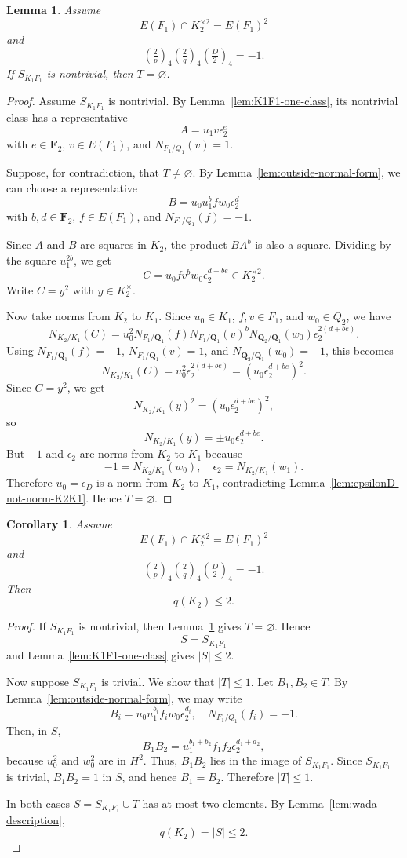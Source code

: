 \documentclass{article}
\numberwithin{equation}{section}
\theoremstyle{plain}  %
\newtheorem{corollary}{Corollary}[section]
\newtheorem{lemma}{Lemma}[section]
\theoremstyle{definition}
\newcommand{\kron}[2]{\left( \tfrac{#1}{#2} \right)}
\begin{document}
\begin{lemma}\label{lem:T-empty-if-SK1F1-nontrivial}
Assume
$$
E(F_1) \cap K_2^{\times 2}=E(F_1)^2
$$
and
$$
\kron{2}{p}_4\kron{2}{q}_4\kron{D}{2}_4=-1.
$$
If $S_{K_1F_1}$ is nontrivial, then $T=\varnothing$.
\end{lemma}

\begin{proof}
Assume $S_{K_1F_1}$ is nontrivial. By Lemma~\ref{lem:K1F1-one-class}, its nontrivial class has a representative
$$
A= u_1v\epsilon_2^e
$$
with $e \in \mathbf F_2$, $v \in E(F_1)$, and $N_{F_1/Q_1}(v)=1$.

Suppose, for contradiction, that $T \ne \varnothing$. By Lemma~\ref{lem:outside-normal-form}, we can choose a representative
$$
B= u_0u_1^b f w_0\epsilon_2^d
$$
with $b,d \in \mathbf F_2$, $f \in E(F_1)$, and $N_{F_1/Q_1}(f)=-1$.

Since $A$ and $B$ are squares in $K_2$, the product $BA^b$ is also a square. Dividing by the square $u_1^{2b}$, we get
$$
C=u_0f v^b w_0\epsilon_2^{d+be} \in K_2^{\times 2}.
$$
Write $C=y^2$ with $y \in K_2^\times$.

Now take norms from $K_2$ to $K_1$. Since $u_0 \in K_1$, $f,v \in F_1$, and $w_0 \in Q_2$, we have
$$
N_{K_2/K_1}(C)=u_0^2N_{F_1/\mathbf Q_1}(f)N_{F_1/\mathbf Q_1}(v)^bN_{\mathbf Q_2/\mathbf Q_1}(w_0)\epsilon_2^{2(d+be)}.
$$
Using $N_{F_1/\mathbf Q_1}(f)=-1$, $N_{F_1/\mathbf Q_1}(v)=1$, and $N_{\mathbf Q_2/\mathbf Q_1}(w_0)=-1$, this becomes
$$
N_{K_2/K_1}(C)=u_0^2\epsilon_2^{2(d+be)}=(u_0\epsilon_2^{d+be})^2.
$$
Since $C=y^2$, we get
$$
N_{K_2/K_1}(y)^2=(u_0\epsilon_2^{d+be})^2,
$$
so
$$
N_{K_2/K_1}(y)=\pm u_0\epsilon_2^{d+be}.
$$
But $-1$ and $\epsilon_2$ are norms from $K_2$ to $K_1$ because
$$
-1=N_{K_2/K_1}(w_0), \quad \epsilon_2=N_{K_2/K_1}(w_1).
$$
Therefore $u_0=\epsilon_D$ is a norm from $K_2$ to $K_1$, contradicting Lemma~\ref{lem:epsilonD-not-norm-K2K1}. Hence $T=\varnothing$.
\end{proof}

\begin{corollary}\label{cor:qK2-le2-from-EF1}
Assume
$$
E(F_1) \cap K_2^{\times 2}=E(F_1)^2
$$
and
$$
\kron{2}{p}_4\kron{2}{q}_4\kron{D}{2}_4=-1.
$$
Then
$$
q(K_2) \le 2.
$$
\end{corollary}

\begin{proof}
If $S_{K_1F_1}$ is nontrivial, then Lemma~\ref{lem:T-empty-if-SK1F1-nontrivial} gives $T=\varnothing$. Hence
$$
S=S_{K_1F_1}
$$
and Lemma~\ref{lem:K1F1-one-class} gives $|S| \le 2$.

Now suppose $S_{K_1F_1}$ is trivial. We show that $|T| \le 1$. Let $B_1,B_2 \in T$. By Lemma~\ref{lem:outside-normal-form}, we may write
$$
B_i=u_0u_1^{b_i}f_iw_0\epsilon_2^{d_i}, \quad N_{F_1/Q_1}(f_i)=-1.
$$
Then, in $S$,
$$
B_1B_2=u_1^{b_1+b_2}f_1f_2\epsilon_2^{d_1+d_2},
$$
because $u_0^2$ and $w_0^2$ are in $H^2$. Thus, $B_1B_2$ lies in the image of $S_{K_1F_1}$. Since $S_{K_1F_1}$ is trivial, $B_1B_2=1$ in $S$, and hence $B_1=B_2$. Therefore $|T| \le 1$.

In both cases $S=S_{K_1F_1} \cup T$ has at most two elements. By Lemma~\ref{lem:wada-description},
$$
q(K_2)=|S| \le 2.
$$
\end{proof}
\end{document}
